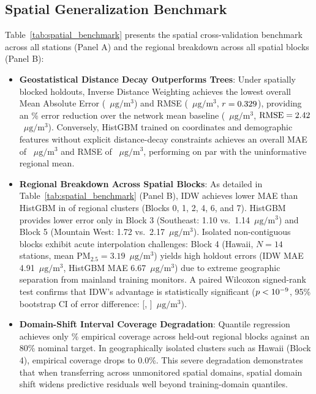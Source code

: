 \documentclass[conference]{IEEEtran}
\begin{document}
\subsection{Spatial Generalization Benchmark}
Table~\ref{tab:spatial_benchmark} presents the spatial cross-validation benchmark across all \numStations{} stations (Panel A) and the regional breakdown across all \numClusters{} spatial blocks (Panel B):
\begin{itemize}
    \item \textbf{Geostatistical Distance Decay Outperforms Trees}: Under spatially blocked holdouts, Inverse Distance Weighting achieves the lowest overall Mean Absolute Error (\maeIdw{}~$\mu\mathrm{g}/\mathrm{m}^3$) and RMSE (\rmseIdw{}~$\mu\mathrm{g}/\mathrm{m}^3$, $r = 0.329{}$), providing an \idwImprPct{}\% error reduction over the network mean baseline (\maeMean{}~$\mu\mathrm{g}/\mathrm{m}^3$, $\text{RMSE} = 2.42{}$~$\mu\mathrm{g}/\mathrm{m}^3$). Conversely, HistGBM trained on coordinates and demographic features without explicit distance-decay constraints achieves an overall MAE of \maeHist{}~$\mu\mathrm{g}/\mathrm{m}^3$ and RMSE of \rmseHist{}~$\mu\mathrm{g}/\mathrm{m}^3$, performing on par with the uninformative regional mean.
    \item \textbf{Regional Breakdown Across Spatial Blocks}: As detailed in Table~\ref{tab:spatial_benchmark} (Panel B), IDW achieves lower MAE than HistGBM in \idwBlockWins{} of \numClusters{} regional clusters (Blocks 0, 1, 2, 4, 6, and 7). HistGBM provides lower error only in Block 3 (Southeast: 1.10 vs.~1.14~$\mu\mathrm{g}/\mathrm{m}^3$) and Block 5 (Mountain West: 1.72 vs.~2.17~$\mu\mathrm{g}/\mathrm{m}^3$). Isolated non-contiguous blocks exhibit acute interpolation challenges: Block 4 (Hawaii, $N=14$ stations, mean $\mathrm{PM}_{2.5} = 3.19$~$\mu\mathrm{g}/\mathrm{m}^3$) yields high holdout errors (IDW MAE 4.91~$\mu\mathrm{g}/\mathrm{m}^3$, HistGBM MAE 6.67~$\mu\mathrm{g}/\mathrm{m}^3$) due to extreme geographic separation from mainland training monitors. A paired Wilcoxon signed-rank test confirms that IDW's advantage is statistically significant ($p < 10^{-9}{}$, 95\% bootstrap CI of error difference: [\ciLowerDiff{}, \ciUpperDiff{}]~$\mu\mathrm{g}/\mathrm{m}^3$).
    \item \textbf{Domain-Shift Interval Coverage Degradation}: Quantile regression achieves only \predictionCoverage{}\% empirical coverage across held-out regional blocks against an 80\% nominal target. In geographically isolated clusters such as Hawaii (Block 4), empirical coverage drops to 0.0\%. This severe degradation demonstrates that when transferring across unmonitored spatial domains, spatial domain shift widens predictive residuals well beyond training-domain quantiles.
\end{itemize}
\end{document}
